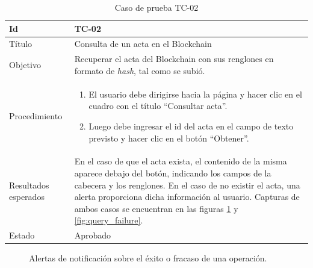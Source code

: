 \begin{table}[H]
\begin{tabularx}{\textwidth}{|m{3cm}|X|}
\hline
Id & TC-02\\
\hline
Título & Consulta de un acta en el Blockchain \\
\hline
Objetivo & Recuperar el acta del Blockchain con sus renglones en formato de \textit{hash}, tal como se subió.\\
\hline
Procedimiento & \begin{enumerate}
    \item El usuario debe dirigirse hacia la página y hacer clic en el cuadro con el título ``Consultar acta''.
    \item Luego debe ingresar el id del acta en el campo de texto previsto y hacer clic en el botón ``Obtener''.
\end{enumerate}\\
\hline
Resultados esperados & En el caso de que el acta exista, el contenido de la misma aparece debajo del botón, indicando los campos de la cabecera y los renglones. En el caso de no existir el acta, una alerta proporciona dicha información al usuario. Capturas de ambos casos se encuentran en las figuras \ref{fig:query_success} y \ref{fig:query_failure}.\\
\hline
Estado & Aprobado\\
\hline
\end{tabularx}
\caption{Caso de prueba TC-02}
\end{table}

\begin{figure}[H]
    \caption{Alertas de notificación sobre el éxito o fracaso de una operación.}
    \label{fig:query_success}
\end{figure}

